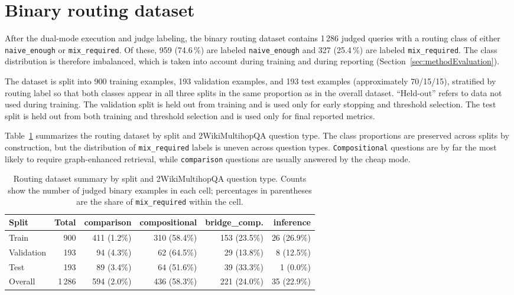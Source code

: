 \documentclass[english, bibtex]{kththesis}               %
\numberwithin{listing}{chapter}
\begin{document}
\section{Binary routing dataset}
\label{sec:methodDataset}

After the dual-mode execution and judge labeling, the binary routing dataset contains 1\,286 judged queries with a routing class of either \texttt{naive\_enough} or \texttt{mix\_required}. Of these, 959 (74.6\,\%) are labeled \texttt{naive\_enough} and 327 (25.4\,\%) are labeled \texttt{mix\_required}. The class distribution is therefore imbalanced, which is taken into account during training and during reporting (Section~\ref{sec:methodEvaluation}).

The dataset is split into 900 training examples, 193 validation examples, and 193 test examples (approximately 70/15/15), stratified by routing label so that both classes appear in all three splits in the same proportion as in the overall dataset. ``Held-out'' refers to data not used during training. The validation split is held out from training and is used only for early stopping and threshold selection. The test split is held out from both training and threshold selection and is used only for final reported metrics.

Table~\ref{tab:datasetSummary} summarizes the routing dataset by split and 2WikiMultihopQA question type. The class proportions are preserved across splits by construction, but the distribution of \texttt{mix\_required} labels is uneven across question types. \texttt{Compositional} questions are by far the most likely to require graph-enhanced retrieval, while \texttt{comparison} questions are usually answered by the cheap mode.

\begin{table}[!ht]
\begin{center}
\caption{Routing dataset summary by split and 2WikiMultihopQA question type. Counts show the number of judged binary examples in each cell; percentages in parentheses are the share of \texttt{mix\_required} within the cell.}
\label{tab:datasetSummary}
\begin{tabular}{l|r|rrrr}
\textbf{Split} & \textbf{Total} & \textbf{comparison} & \textbf{compositional} & \textbf{bridge\_comp.} & \textbf{inference} \\
\hline
Train & 900 & 411 (1.2\%) & 310 (58.4\%) & 153 (23.5\%) & 26 (26.9\%) \\
Validation & 193 & 94 (4.3\%) & 62 (64.5\%) & 29 (13.8\%) & 8 (12.5\%) \\
Test & 193 & 89 (3.4\%) & 64 (51.6\%) & 39 (33.3\%) & 1 (0.0\%) \\
\hline
Overall & 1\,286 & 594 (2.0\%) & 436 (58.3\%) & 221 (24.0\%) & 35 (22.9\%) \\
\end{tabular}
\end{center}
\end{table}
\end{document}
